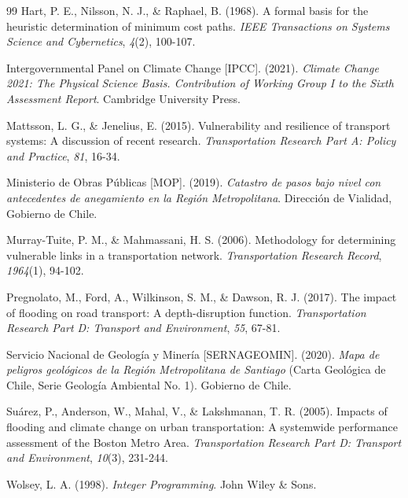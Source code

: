 \documentclass[conference]{IEEEtran}
\begin{document}
\begin{thebibliography}{99}
Hart, P. E., Nilsson, N. J., \& Raphael, B. (1968). A formal basis for the heuristic determination of minimum cost paths. \textit{IEEE Transactions on Systems Science and Cybernetics}, \textit{4}(2), 100-107.

Intergovernmental Panel on Climate Change [IPCC]. (2021). \textit{Climate Change 2021: The Physical Science Basis. Contribution of Working Group I to the Sixth Assessment Report}. Cambridge University Press.

Mattsson, L. G., \& Jenelius, E. (2015). Vulnerability and resilience of transport systems: A discussion of recent research. \textit{Transportation Research Part A: Policy and Practice}, \textit{81}, 16-34.

Ministerio de Obras Públicas [MOP]. (2019). \textit{Catastro de pasos bajo nivel con antecedentes de anegamiento en la Región Metropolitana}. Dirección de Vialidad, Gobierno de Chile.

Murray-Tuite, P. M., \& Mahmassani, H. S. (2006). Methodology for determining vulnerable links in a transportation network. \textit{Transportation Research Record}, \textit{1964}(1), 94-102.

Pregnolato, M., Ford, A., Wilkinson, S. M., \& Dawson, R. J. (2017). The impact of flooding on road transport: A depth-disruption function. \textit{Transportation Research Part D: Transport and Environment}, \textit{55}, 67-81.

Servicio Nacional de Geología y Minería [SERNAGEOMIN]. (2020). \textit{Mapa de peligros geológicos de la Región Metropolitana de Santiago} (Carta Geológica de Chile, Serie Geología Ambiental No. 1). Gobierno de Chile.

Suárez, P., Anderson, W., Mahal, V., \& Lakshmanan, T. R. (2005). Impacts of flooding and climate change on urban transportation: A systemwide performance assessment of the Boston Metro Area. \textit{Transportation Research Part D: Transport and Environment}, \textit{10}(3), 231-244.

Wolsey, L. A. (1998). \textit{Integer Programming}. John Wiley \& Sons.

\end{thebibliography}
\end{document}
